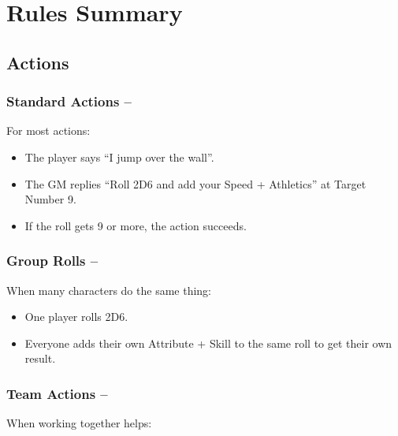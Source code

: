\section*{Rules Summary}

\begin{multicols}{2}

\subsection{Actions}

\subsubsection{Standard Actions -- \pageref{basicaction}}

For most actions:

\begin{itemize}

	\item{The player says ``I jump over the wall''.}
	\item{The GM replies ``Roll 2D6 and add your Speed + Athletics'' at Target Number 9.}
	\item{If the roll gets 9 or more, the action succeeds.}

\end{itemize}

\subsubsection{Group Rolls -- \pageref{grouproll}}

When many characters do the same thing:

\begin{itemize}

	\item{One player rolls 2D6.}
	\item{Everyone adds their own Attribute + Skill to the same roll to get their own result.}

\end{itemize}

\subsubsection{Team Actions -- \pageref{teamwork}}

When working together helps:

\begin{itemize}


\end{itemize}
\end{multicols}
